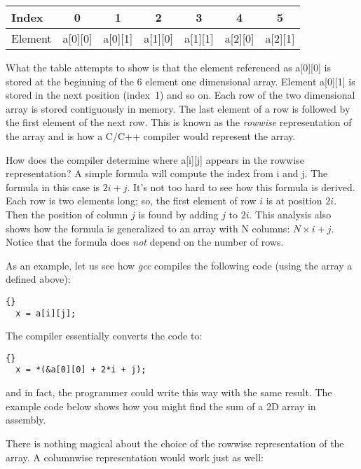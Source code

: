 \parbox{\textwidth}{
\vspace{0.5em}
\centering
\begin{tabular}{||l|c|c|c|c|c|c||}
\hline
Index & 0 & 1 & 2 & 3 & 4 & 5 \\
\hline
Element & a[0][0] & a[0][1] & a[1][0] & a[1][1] & a[2][0] & a[2][1]  \\
\hline
\end{tabular}
\vspace{0.5em}
}
\noindent What the table attempts to show is that the element referenced as 
{\code a[0][0]} is stored at the beginning of the 6 element one
dimensional array. Element {\code a[0][1]} is stored in the next
position (index~1) and so on. Each row of the two dimensional array is
stored contiguously in memory. The last element of a row is followed
by the first element of the next row. This is known as the
\emph{rowwise} representation of the array and is how a C/C++ compiler would
represent the array.

How does the compiler determine where {\code a[i][j]} appears in the rowwise
representation? A simple formula will compute the index from {\code i} and
{\code j}. The formula in this case is $2i + j$. It's not too hard to see how
this formula is derived. Each row is two elements long; so, the first element
of row $i$ is at position $2i$. Then the position of column $j$ is found by
adding $j$ to $2i$. This analysis also shows how the formula is generalized 
to an array with {\code N} columns: $N \times i + j$. Notice that the formula
does \emph{not} depend on the number of rows.

As an example, let us see how \emph{gcc} compiles the following code (using the
array {\code a} defined above):
\begin{lstlisting}[stepnumber=0]{}
  x = a[i][j];
\end{lstlisting}
The compiler essentially converts the code to:
\begin{lstlisting}[stepnumber=0]{}
  x = *(&a[0][0] + 2*i + j);
\end{lstlisting}
and in fact, the programmer could write this way with the same result.  The example code 
below shows how you might find the sum of a 2D array in assembly.



There is nothing magical about the choice of the rowwise representation of the
array. A columnwise representation would work just as well: 

